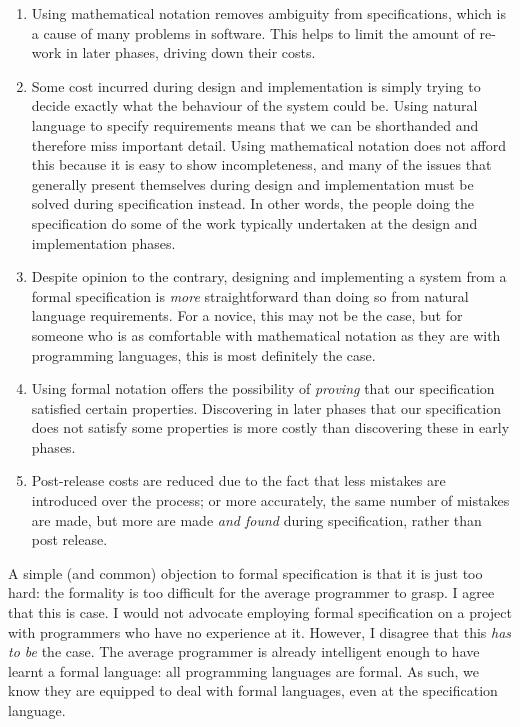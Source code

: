 \begin{enumerate}
 \item Using mathematical notation removes ambiguity from specifications, which is a cause of many problems in software. This helps to limit the amount of re-work in later phases, driving down their costs.

 \item Some cost incurred during design and implementation is simply trying to decide exactly what the behaviour of the system could be. Using natural language to specify requirements means that we can be shorthanded and therefore miss important detail. Using mathematical notation does not afford this because it is easy to show incompleteness, and many of the issues that generally present themselves during design and implementation must be solved during specification instead. In other words, the people doing the specification do some of the work typically undertaken at the design and implementation phases.


 \item Despite opinion to the contrary, designing and implementing a system from a formal specification is \emph{more} straightforward than doing so from natural language requirements. For a novice, this may not be the case, but for someone who is as comfortable with mathematical notation as they are with programming languages, this is most definitely the case.

 \item Using formal notation offers the possibility of \emph{proving} that our specification satisfied certain properties. Discovering in later phases that our specification does not satisfy some properties is more costly than discovering these in early phases.

 \item Post-release costs are reduced due to the fact that less mistakes are introduced over the process; or more accurately, the same number of mistakes are made, but more are made \emph{and found} during specification, rather than post release.
\end{enumerate}

A simple (and common) objection to formal specification is that it is just too hard: the formality is too difficult for the average programmer to grasp. I agree that this is case. I would not advocate employing formal specification on a project with programmers who have no experience at it. However, I disagree that this \emph{has to be} the case. The average programmer is already intelligent enough to have learnt a formal language: all programming languages are formal. As such, we know they are equipped to deal with formal languages, even at the specification language. 

